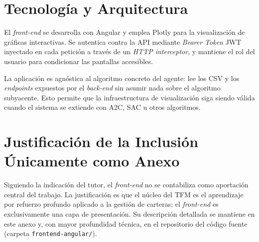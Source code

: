 \documentclass[IB,a4paper]{TFUOC}
\begin{document}
\section{Tecnología y Arquitectura}

El \textit{front-end} se desarrolla con Angular y emplea Plotly para la visualización de gráficas interactivas. Se autentica contra la API mediante \textit{Bearer Token} JWT inyectado en cada petición a través de un \textit{HTTP interceptor}, y mantiene el rol del usuario para condicionar las pantallas accesibles.

La aplicación es agnóstica al algoritmo concreto del agente: lee los CSV y los \textit{endpoints} expuestos por el \textit{back-end} sin asumir nada sobre el algoritmo subyacente. Esto permite que la infraestructura de visualización siga siendo válida cuando el sistema se extiende con A2C, SAC u otros algoritmos.

\section{Justificación de la Inclusión Únicamente como Anexo}

Siguiendo la indicación del tutor, el \textit{front-end} no se contabiliza como aportación central del trabajo. La justificación es que el núcleo del TFM es el aprendizaje por refuerzo profundo aplicado a la gestión de carteras; el \textit{front-end} es exclusivamente una capa de presentación. Su descripción detallada se mantiene en este anexo y, con mayor profundidad técnica, en el repositorio del código fuente (carpeta \texttt{frontend-angular/}).
\end{document}
